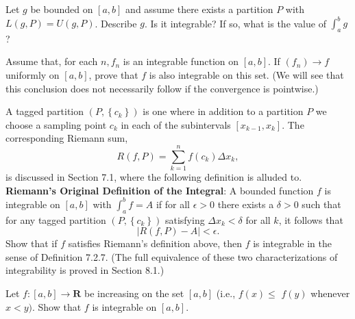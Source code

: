 \begin{exercise}
Let $g$ be bounded on $[a, b]$ and assume there exists a partition $P$ with $L(g, P)=U(g, P)$. Describe $g$. Is it integrable? If so, what is the value of $\int_{a}^{b} g$ ?
\end{exercise}
\begin{solution}
    \TODO
\end{solution}

\begin{exercise}
Assume that, for each $n, f_{n}$ is an integrable function on $[a, b]$. If $\left(f_{n}\right) \rightarrow f$ uniformly on $[a, b]$, prove that $f$ is also integrable on this set. (We will see that this conclusion does not necessarily follow if the convergence is pointwise.)
\end{exercise}
\begin{solution}
    \TODO
\end{solution}

\begin{exercise}
A tagged partition $\left(P,\left\{c_{k}\right\}\right)$ is one where in addition to a partition $P$ we choose a sampling point $c_{k}$ in each of the subintervals $\left[x_{k-1}, x_{k}\right]$. The corresponding Riemann sum,
$$
R(f, P)=\sum_{k=1}^{n} f\left(c_{k}\right) \Delta x_{k},
$$
is discussed in Section 7.1, where the following definition is alluded to.
{\bf Riemann's Original Definition of the Integral}: A bounded function $f$ is integrable on $[a, b]$ with $\int_{a}^{b} f=A$ if for all $\epsilon>0$ there exists a $\delta>0$ such that for any tagged partition $\left(P,\left\{c_{k}\right\}\right)$ satisfying $\Delta x_{k}<\delta$ for all $k$, it follows that
$$
|R(f, P)-A|<\epsilon .
$$
Show that if $f$ satisfies Riemann's definition above, then $f$ is integrable in the sense of Definition 7.2.7. (The full equivalence of these two characterizations of integrability is proved in Section 8.1.)
\end{exercise}
\begin{solution}
    \TODO
\end{solution}

\begin{exercise}
Let $f:[a, b] \rightarrow \mathbf{R}$ be increasing on the set $[a, b]$ (i.e., $f(x) \leq$ $f(y)$ whenever $x<y)$. Show that $f$ is integrable on $[a, b]$.
\end{exercise}
\begin{solution}
    \TODO
\end{solution}
